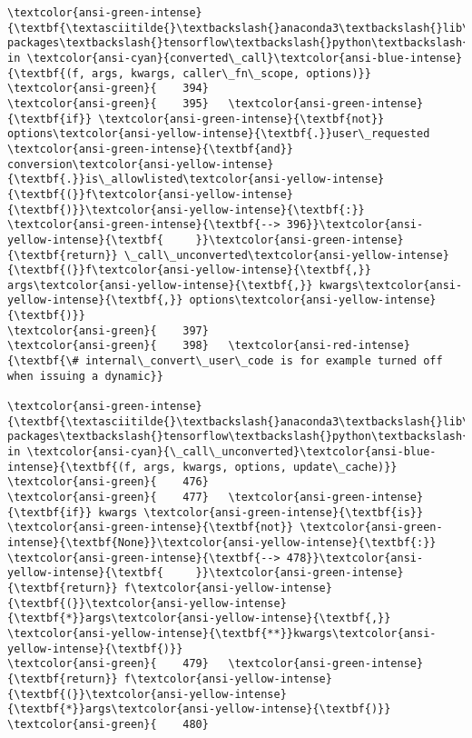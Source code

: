 \documentclass[11pt]{article}
\begin{document}
\begin{Verbatim}[commandchars=\\\{\}, frame=single, framerule=2mm, rulecolor=\color{outerrorbackground}]
\textcolor{ansi-green-intense}{\textbf{\textasciitilde{}\textbackslash{}anaconda3\textbackslash{}lib\textbackslash{}site-packages\textbackslash{}tensorflow\textbackslash{}python\textbackslash{}autograph\textbackslash{}impl\textbackslash{}api.py}} in \textcolor{ansi-cyan}{converted\_call}\textcolor{ansi-blue-intense}{\textbf{(f, args, kwargs, caller\_fn\_scope, options)}}
\textcolor{ansi-green}{    394} 
\textcolor{ansi-green}{    395}   \textcolor{ansi-green-intense}{\textbf{if}} \textcolor{ansi-green-intense}{\textbf{not}} options\textcolor{ansi-yellow-intense}{\textbf{.}}user\_requested \textcolor{ansi-green-intense}{\textbf{and}} conversion\textcolor{ansi-yellow-intense}{\textbf{.}}is\_allowlisted\textcolor{ansi-yellow-intense}{\textbf{(}}f\textcolor{ansi-yellow-intense}{\textbf{)}}\textcolor{ansi-yellow-intense}{\textbf{:}}
\textcolor{ansi-green-intense}{\textbf{--> 396}}\textcolor{ansi-yellow-intense}{\textbf{     }}\textcolor{ansi-green-intense}{\textbf{return}} \_call\_unconverted\textcolor{ansi-yellow-intense}{\textbf{(}}f\textcolor{ansi-yellow-intense}{\textbf{,}} args\textcolor{ansi-yellow-intense}{\textbf{,}} kwargs\textcolor{ansi-yellow-intense}{\textbf{,}} options\textcolor{ansi-yellow-intense}{\textbf{)}}
\textcolor{ansi-green}{    397} 
\textcolor{ansi-green}{    398}   \textcolor{ansi-red-intense}{\textbf{\# internal\_convert\_user\_code is for example turned off when issuing a dynamic}}

\textcolor{ansi-green-intense}{\textbf{\textasciitilde{}\textbackslash{}anaconda3\textbackslash{}lib\textbackslash{}site-packages\textbackslash{}tensorflow\textbackslash{}python\textbackslash{}autograph\textbackslash{}impl\textbackslash{}api.py}} in \textcolor{ansi-cyan}{\_call\_unconverted}\textcolor{ansi-blue-intense}{\textbf{(f, args, kwargs, options, update\_cache)}}
\textcolor{ansi-green}{    476} 
\textcolor{ansi-green}{    477}   \textcolor{ansi-green-intense}{\textbf{if}} kwargs \textcolor{ansi-green-intense}{\textbf{is}} \textcolor{ansi-green-intense}{\textbf{not}} \textcolor{ansi-green-intense}{\textbf{None}}\textcolor{ansi-yellow-intense}{\textbf{:}}
\textcolor{ansi-green-intense}{\textbf{--> 478}}\textcolor{ansi-yellow-intense}{\textbf{     }}\textcolor{ansi-green-intense}{\textbf{return}} f\textcolor{ansi-yellow-intense}{\textbf{(}}\textcolor{ansi-yellow-intense}{\textbf{*}}args\textcolor{ansi-yellow-intense}{\textbf{,}} \textcolor{ansi-yellow-intense}{\textbf{**}}kwargs\textcolor{ansi-yellow-intense}{\textbf{)}}
\textcolor{ansi-green}{    479}   \textcolor{ansi-green-intense}{\textbf{return}} f\textcolor{ansi-yellow-intense}{\textbf{(}}\textcolor{ansi-yellow-intense}{\textbf{*}}args\textcolor{ansi-yellow-intense}{\textbf{)}}
\textcolor{ansi-green}{    480} 


\end{Verbatim}
\end{document}
